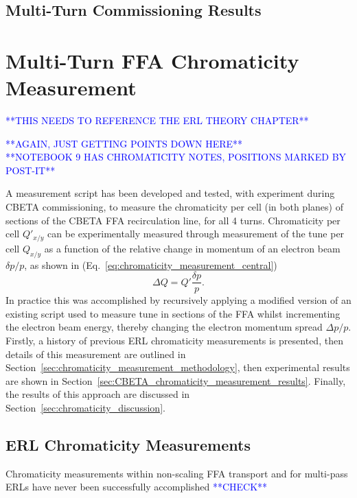 \documentclass[../main.tex]{subfiles}
\begin{document}
\subsection{Multi-Turn Commissioning Results}

\section{Multi-Turn FFA Chromaticity Measurement}

\textcolor{blue}{**THIS NEEDS TO REFERENCE THE ERL THEORY CHAPTER**}

\textcolor{blue}{**AGAIN, JUST GETTING POINTS DOWN HERE** \\ **NOTEBOOK 9 HAS CHROMATICITY NOTES, POSITIONS MARKED BY POST-IT**}

A measurement script has been developed and tested, with experiment during CBETA commissioning, to measure the chromaticity per cell (in both planes) of sections of the CBETA FFA recirculation line, for all 4 turns. Chromaticity per cell $Q'_{x/y}$ can be experimentally measured through measurement of the tune per cell $Q_{x/y}$ as a function of the relative change in momentum of an electron beam $\delta p/p$, as shown in (Eq.~\ref{eq:chromaticity_measurement_central})
\begin{equation}
\Delta Q = Q'\frac{\delta p}{p}.
\label{eq:chromaticity_measurement_central}
\end{equation}
In practice this was accomplished by recursively applying a modified version of an existing script used to measure tune in sections of the FFA whilst incrementing the electron beam energy, thereby changing the electron momentum spread $\Delta p/p$. Firstly, a history of previous ERL chromaticity measurements is presented, then details of this measurement are outlined in Section~\ref{sec:chromaticity_measurement_methodology}, then experimental results are shown in Section~\ref{sec:CBETA_chromaticity_measurement_results}. Finally, the results of this approach are discussed in Section~\ref{sec:chromaticity_discussion}. 

\subsection{ERL Chromaticity Measurements}
\label{sec:ERL_chromaticity_measurements}

Chromaticity measurements within non-scaling FFA transport and for multi-pass ERLs have never been successfully accomplished \textcolor{blue}{**CHECK**}
\end{document}
